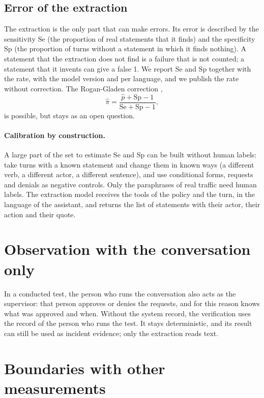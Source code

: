 \documentclass[11pt,a4paper]{article}
\begin{document}
\subsection{Error of the extraction}

The extraction is the only part that can make errors. Its error is described by the sensitivity $\mathrm{Se}$
(the proportion of real statements that it finds) and the specificity $\mathrm{Sp}$ (the proportion of turns
without a statement in which it finds nothing). A statement that the extraction does not find is a failure that is
not counted; a statement that it invents can give a false 1. We report $\mathrm{Se}$ and $\mathrm{Sp}$ together
with the rate, with the model version and per language, and we publish the rate without correction. The
Rogan-Gladen correction \cite{rogan1978},
\begin{equation}
  \hat{\pi} = \frac{\hat{p} + \mathrm{Sp} - 1}{\mathrm{Se} + \mathrm{Sp} - 1},
\end{equation}
is possible, but stays as an open question.

\paragraph{Calibration by construction.} A large part of the set to estimate $\mathrm{Se}$ and $\mathrm{Sp}$ can be
built without human labels: take turns with a known statement and change them in known ways (a different verb, a
different actor, a different sentence), and use conditional forms, requests and denials as negative controls. Only
the paraphrases of real traffic need human labels. The extraction model receives the tools of the policy and the
turn, in the language of the assistant, and returns the list of statements with their actor, their action and
their quote.

\section{Observation with the conversation only}

In a conducted test, the person who runs the conversation also acts as the supervisor: that person approves or
denies the requests, and for this reason knows what was approved and when. Without the system record, the
verification uses the record of the person who runs the test. It stays deterministic, and its result can still be
used as incident evidence; only the extraction reads text.

\section{Boundaries with other measurements}
\label{sec:boundaries}
\end{document}
